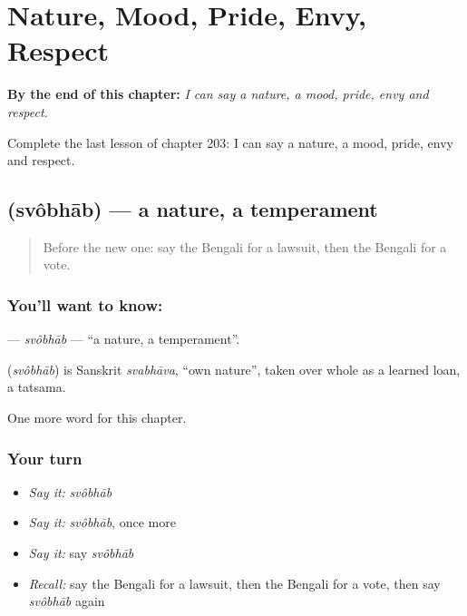 
\chapter{Nature, Mood, Pride, Envy, Respect}
\label{ch:bn-nature-mood-pride-envy-respect}

\begin{chapteropening}
\textbf{By the end of this chapter:} \emph{I can say a nature, a mood, pride, envy and respect.}

Complete the last lesson of chapter 203: I can say a nature, a mood, pride, envy and respect.
\end{chapteropening}

\section[\texorpdfstring{\bn{স্বভাব} (svôbhāb)}{স্বভাব (svôbhāb)}]{ (svôbhāb) — a nature, a temperament}

\label{lesson:BN-C203-svobhab}



\begin{quote}
Before the new one: say the Bengali for a lawsuit, then the Bengali for a vote.
\end{quote}

\subsection*{You'll want to know: }
\textbf{} — \emph{svôbhāb} — \textquotedblleft{}a nature, a temperament\textquotedblright{}.

\begin{cousinweb}
\textbf{} (\emph{svôbhāb}) is Sanskrit \emph{svabhāva}, \textquotedblleft{}own nature\textquotedblright{}, taken over whole as a learned loan, a tatsama.
\end{cousinweb}

\begin{grammarlens}[title={What you've built}]
One more word for this chapter.
\end{grammarlens}

\subsection*{Your turn}
\begin{itemize}
\raggedright
  \item \emph{Say it:} \emph{svôbhāb}
  \item \emph{Say it:} \emph{svôbhāb}, once more
  \item \emph{Say it:} say \emph{svôbhāb}
  \item \emph{Recall:} say the Bengali for a lawsuit, then the Bengali for a vote, then say \emph{svôbhāb} again
\end{itemize}


